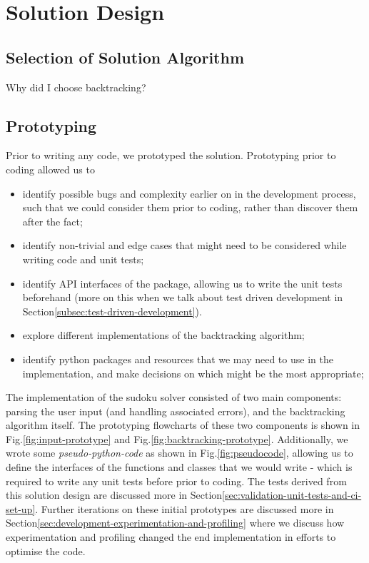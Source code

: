 
\section{Solution Design}\label{sec:selection-of-solution-algorithm-and-prototyping}
    \subsection{Selection of Solution Algorithm}\label{subsec:solution-algorithm}
    Why did I choose backtracking?

    \subsection{Prototyping}\label{subsec:prototyping}
    Prior to writing any code, we prototyped the solution.
    Prototyping prior to coding allowed us to
    \begin{itemize}
        \item identify possible bugs and complexity earlier on in the development process, such that we could consider them
        prior to coding, rather than discover them after the fact;
        \item identify non-trivial and edge cases that might need to be considered while writing code and unit tests;
        \item identify API interfaces of the package, allowing us to write the unit tests beforehand (more on this when
        we talk about test driven development in Section\eqref{subsec:test-driven-development}).
        \item explore different implementations of the backtracking algorithm;
        \item identify python packages and resources that we may need to use in the implementation, and make decisions on which
        might be the most appropriate;
    \end{itemize}
    The implementation of the sudoku solver consisted of two main components: parsing the user input (and handling
    associated errors), and the backtracking algorithm itself.
    The prototyping flowcharts of these two components is shown in Fig.\eqref{fig:input-prototype} and Fig.\eqref{fig:backtracking-prototype}.
    Additionally, we wrote some \textit{pseudo-python-code} as shown in Fig.\eqref{fig:pseudocode}, allowing us to define
    the interfaces of the functions and classes that we would write - which is required to write any unit tests before prior
    to coding.
    The tests derived from this solution design are discussed more in Section\eqref{sec:validation-unit-tests-and-ci-set-up}.
    Further iterations on these initial prototypes are discussed more in Section\eqref{sec:development-experimentation-and-profiling}
    where we discuss how experimentation and profiling changed the end implementation in efforts to optimise the code.

